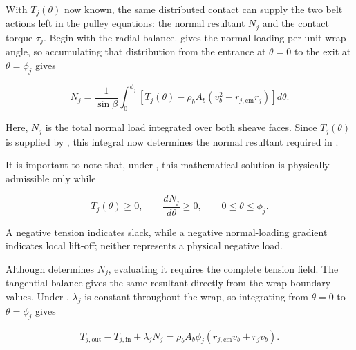 \documentclass[11pt]{report}
\numberwithin{equation}{section}
\newcounter{assump}
\begin{document}
With \(T_j(\theta)\) now known, the same distributed contact can supply the
two belt actions left in the pulley equations: the normal resultant \(N_j\)
and the contact torque \(\tau_j\). Begin with the radial balance.
 gives the normal loading per unit wrap angle,
so accumulating that distribution from the entrance at \(\theta=0\) to the
exit at \(\theta=\phi_j\) gives

\begin{equation}
    N_j
    =
    \frac{1}{\sin\beta}
    \int_0^{\phi_j}
    \left[
        T_j(\theta)
        -
        \rho_bA_b
        \left(
            v_b^2-r_{j,\mathrm{cm}}\ddot r_j
        \right)
    \right]d\theta.
    \label{eq:wrap_normal_resultant_integral}
\end{equation}

Here, \(N_j\) is the total normal load integrated over both sheave faces. Since
\(T_j(\theta)\) is supplied by
, this integral now determines the normal
resultant required in
.

It is important to note that, under
, this mathematical solution is physically
admissible only while

\begin{equation}
    T_j(\theta)\geq0,
    \qquad
    \frac{dN_j}{d\theta}\geq0,
    \qquad
    0\leq\theta\leq\phi_j.
    \label{eq:wrap_contact_admissibility}
\end{equation}

A negative tension indicates slack, while a negative normal-loading gradient
indicates local lift-off; neither represents a physical negative load.

Although  determines \(N_j\),
evaluating it requires the complete tension field. The tangential balance gives
the same resultant directly from the wrap boundary values. Under
, \(\lambda_j\) is constant throughout
the wrap, so integrating  from
\(\theta=0\) to \(\theta=\phi_j\) gives

\begin{equation}
    T_{j,\mathrm{out}}-T_{j,\mathrm{in}}
    +\lambda_jN_j
    =
    \rho_bA_b\phi_j
    \left(
        r_{j,\mathrm{cm}}\dot v_b+
        \dot r_jv_b
    \right).
    \label{eq:integrated_wrap_tangential_balance}
\end{equation}
\end{document}
